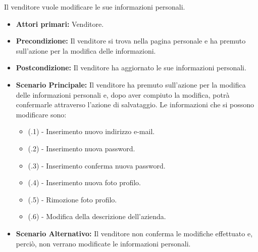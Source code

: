 
Il venditore vuole modificare le sue informazioni personali.
\begin{itemize}
    \item \textbf{Attori primari:} Venditore.
    \item \textbf{Precondizione:} Il venditore si trova nella pagina personale e ha premuto sull'azione per la modifica delle informazioni.
    \item \textbf{Postcondizione:} Il venditore ha aggiornato le sue informazioni personali.
    \item \textbf{Scenario Principale:} Il venditore ha premuto sull'azione per la modifica delle informazioni personali e, dopo aver compiuto la modifica, potrà confermarle attraverso l'azione di salvataggio. Le informazioni che si possono modificare sono:
    \begin{itemize}
        \item (\actualUC.1) - Inserimento nuovo indirizzo e-mail.
        \item (\actualUC.2) - Inserimento nuova password.
        \item (\actualUC.3) - Inserimento conferma nuova password.
        \item (\actualUC.4) - Inserimento nuova foto profilo.
        \item (\actualUC.5) - Rimozione foto profilo.
        \item (\actualUC.6) - Modifica della descrizione dell'azienda.
    \end{itemize}
    \item \textbf{Scenario Alternativo:} Il venditore non conferma le modifiche effettuato e, perciò, non verrano modificate le informazioni personali.
\end{itemize}

\resetSubUC

